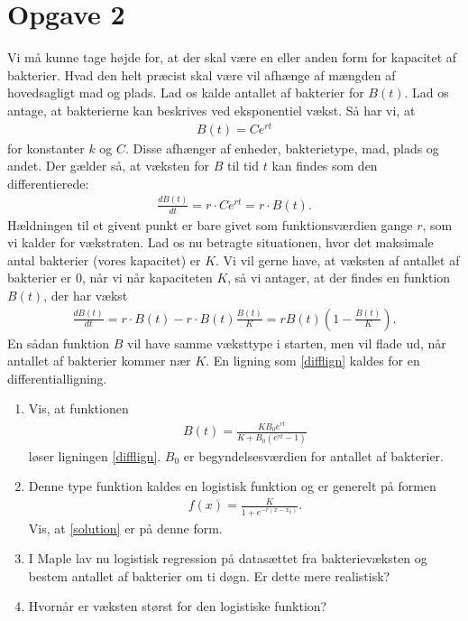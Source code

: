 \section*{Opgave 2}
Vi må kunne tage højde for, at der skal være en eller anden form for kapacitet af bakterier. Hvad den helt præcist skal være vil afhænge af mængden af hovedsagligt mad og plads. 
Lad os kalde antallet af bakterier for $B(t)$. Lad os antage, at bakterierne kan beskrives ved eksponentiel vækst. Så har vi, at 
\begin{align*}
B(t) = Ce^{r t}
\end{align*}
for konstanter $k$ og $C$. Disse afhænger af enheder, bakterietype, mad, plads og andet. Der gælder så, at væksten for $B$ til tid $t$ kan findes som den differentierede:
\begin{align*}
\frac{dB(t)}{dt} = r\cdot Ce^{rt} = r\cdot B(t).
\end{align*}
Hældningen til et givent punkt er bare givet som funktionsværdien gange $r$, som vi kalder for vækstraten. Lad os nu betragte situationen, hvor det maksimale antal bakterier (vores kapacitet) er $K$. Vi vil gerne have, at væksten af antallet af bakterier er $0$, når vi når kapaciteten $K$, så vi antager, at der findes en funktion $B(t)$, der har vækst
\begin{align}
\label{difflign}
\frac{dB(t)}{dt} = r\cdot B(t) - r\cdot B(t) \frac{B(t)}{K} = rB(t)\left(1-\frac{B(t)}{K} \right).
\end{align}
En sådan funktion $B$ vil have samme væksttype i starten, men vil flade ud, når antallet af bakterier kommer nær $K$. En ligning som \eqref{difflign} kaldes for en differentialligning. 
\begin{enumerate}[label=\roman*)]
\item Vis, at funktionen
\begin{align}\label{solution}
B(t) = \frac{KB_0e^{rt}}{K+B_0(e^{rt}-1)} 
\end{align}
løser ligningen \eqref{difflign}. $B_0$ er begyndelsesværdien for antallet af bakterier.
\item Denne type funktion kaldes en logistisk funktion og er generelt på formen
\begin{align*}
f(x) = \frac{K}{1+e^{-r(x-x_0)}}.
\end{align*}
Vis, at \eqref{solution} er på denne form.
\item I Maple lav nu logistisk regression på datasættet fra bakterievæksten og bestem antallet af bakterier om ti døgn. Er dette mere realistisk?
\item Hvornår er væksten størst for den logistiske funktion?
\end{enumerate}